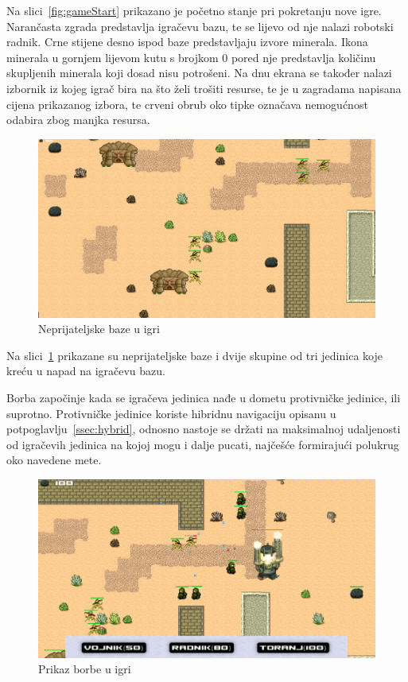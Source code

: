 \documentclass[times, utf8, zavrsni, numeric]{fer}
\begin{document}
\par Na slici~\ref{fig:gameStart} prikazano je početno stanje pri pokretanju nove igre.
Narančasta zgrada predstavlja igračevu bazu, te se lijevo od nje nalazi robotski radnik.
Crne stijene desno ispod baze predstavljaju izvore minerala.
Ikona minerala u gornjem lijevom kutu s brojkom 0 pored nje predstavlja količinu skupljenih minerala koji dosad nisu potrošeni.
Na dnu ekrana se također nalazi izbornik iz kojeg igrač bira na što želi trošiti resurse, te je u zagradama napisana cijena prikazanog izbora, te crveni obrub oko tipke označava nemogućnost odabira zbog manjka resursa.

\begin{figure}[h]
	\centering
	\includegraphics[width=0.9\linewidth]{images/enemyBases.png}
	\caption{Neprijateljske baze u igri}
	\label{fig:enemyBases}
\end{figure}

\par Na slici~\ref{fig:enemyBases} prikazane su neprijateljske baze i dvije skupine od tri jedinica koje kreću u napad na igračevu bazu.

\par Borba započinje kada se igračeva jedinica nađe u dometu protivničke jedinice, ili suprotno.
Protivničke jedinice koriste hibridnu navigaciju opisanu u potpoglavlju~\ref{ssec:hybrid}, odnosno nastoje se držati na maksimalnoj udaljenosti od igračevih jedinica na kojoj mogu i dalje pucati, najčešće formirajući polukrug oko navedene mete.

\begin{figure}[h]
	\centering
	\includegraphics[width=0.9\linewidth]{images/battle.png}
	\caption{Prikaz borbe u igri}
	\label{fig:battle}
\end{figure}
\end{document}
